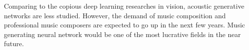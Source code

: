 \begin{par}
    \par \hspace{15pt} Comparing to the copious deep learning researches in vision, acoustic generative networks are less studied. However, the demand of music composition and professional music composers are expected to go up in the next few years. Music generating neural network would be one of the most lucrative fields in the near future. 
\end{par}